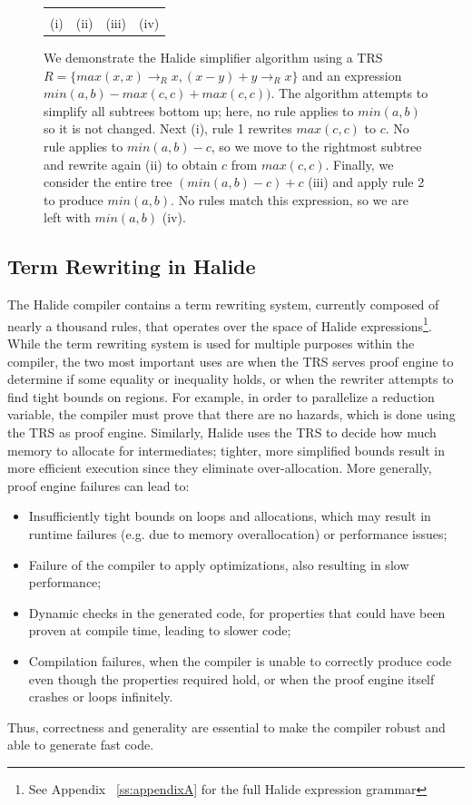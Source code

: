 \documentclass[sigplan,10pt,review,anonymous]{acmart}\settopmatter{printfolios=true,printccs=false,printacmref=false}
\begin{document}
\begin{figure}
\begin{tabular}{cccc}
\begin{tikzpicture}[level distance=12mm]
\end{tikzpicture} \\
(i) & (ii) & (iii) & (iv)
\end{tabular}
\caption{We demonstrate the Halide simplifier algorithm using a TRS $R = \{max(x,x) \rightarrow_R x, (x - y) + y \rightarrow_R x\}$ and an expression $min(a,b) - max(c,c) + max(c,c))$. The algorithm attempts to simplify all subtrees bottom up; here, no rule applies to $min(a,b)$ so it is not changed. Next (i), rule 1 rewrites $max(c,c)$ to $c$. No rule applies to $min(a,b) - c$, so we move to the rightmost subtree and rewrite again (ii) to obtain $c$ from $max(c,c)$. Finally, we consider the entire tree $(min(a,b) - c) + c$ (iii) and apply rule 2 to produce $min(a,b)$. No rules match this expression, so we are left with $min(a,b)$ (iv).}
\label{fig:algoexample}
\end{figure}

\subsection{Term Rewriting in Halide}

The Halide compiler contains a term rewriting system, currently composed of
nearly a thousand rules, that operates over the space of Halide
expressions\footnote{See Appendix ~\ref{ss:appendixA} for the full Halide
  expression grammar}. While the term rewriting system is used for multiple
purposes within the compiler, the two most important
uses are when the TRS serves proof engine to determine if
some equality or inequality holds, or when the rewriter attempts to find tight
bounds on regions. For example, in order to parallelize a
reduction variable, the compiler must prove that there are no hazards, which is
done using the TRS as proof engine.  Similarly, Halide uses
the TRS to decide how much memory to allocate for intermediates; tighter, more
simplified bounds result in more efficient execution since they eliminate over-allocation.
More generally, proof engine failures can lead to:
\begin{itemize}
\item Insufficiently tight bounds on loops and allocations, which may result in
  runtime failures (e.g. due to memory overallocation) or performance issues;

\item Failure of the compiler to apply optimizations, also resulting in slow performance;

\item Dynamic checks in the generated code, for properties that could have been proven
  at compile time, leading to slower code;

\item Compilation failures, when the compiler is unable to correctly produce code
  even though the properties required hold, or when the proof engine itself crashes
  or loops infinitely.
\end{itemize}
Thus, correctness and generality are essential to make the compiler robust and
able to generate fast code.
\end{document}
